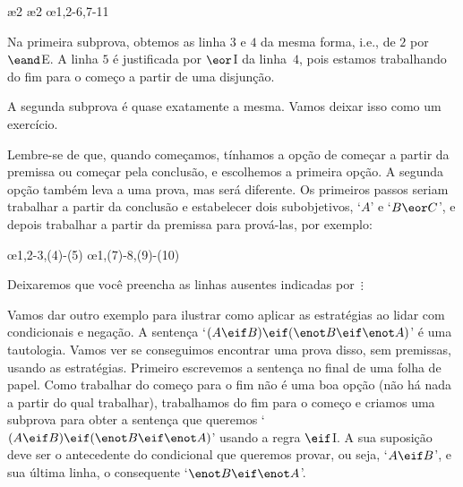 \begin{fitchproof}
	\open
	\ae{2}
	\ae{2}
	\close
	\open
	\ellipsesline
	\close
	\oe{1,2-6,7-11}
\end{fitchproof}
Na primeira subprova, obtemos as linha $3$ e $4$ da mesma forma, i.e.,  de $2$ por  $\eand$E. A linha $5$  é justificada por $\eor$I da linha~$4$, pois estamos trabalhando do fim para o começo a partir de uma disjunção.

A segunda subprova é quase exatamente a mesma. Vamos deixar isso como um exercício.

Lembre-se de que, quando começamos, tínhamos a opção de começar a partir da premissa ou começar pela conclusão, e escolhemos a primeira opção. A segunda opção também leva a uma prova, mas será diferente. Os primeiros passos seriam trabalhar a partir da conclusão e estabelecer dois subobjetivos, `$A$' e `$B \eor C$', e depois trabalhar a partir da premissa para prová-las, por exemplo:
 

\begin{fitchproof}
	\open
	\ellipsesline
	\close
	\open
	\ellipsesline
	\close
	\oe{1,2-3,(4)-(5)}
	\open
	\ellipsesline
	\close
	\open
	\ellipsesline
	\close
	\oe{1,(7)-8,(9)-(10)}	
\end{fitchproof}
Deixaremos que você preencha as linhas ausentes indicadas por~$\vdots$

Vamos dar outro exemplo para ilustrar como aplicar as estratégias ao lidar com condicionais e negação. A sentença `$(A \eif B) \eif (\enot B \eif \enot A)$' é uma tautologia. 
Vamos ver se conseguimos encontrar uma prova disso, sem premissas, usando as estratégias. Primeiro escrevemos a sentença no final de uma folha de papel. Como trabalhar do começo para o fim não é uma boa opção (não há nada a partir do qual trabalhar), trabalhamos do fim para o começo e criamos uma subprova para obter a  sentença que queremos `$(A \eif B) \eif (\enot B \eif \enot A)$' usando a regra  $\eif$I. A sua suposição deve ser o antecedente do condicional que queremos provar, ou seja, `$A \eif B$', e sua última linha, o consequente `$\enot B \eif \enot A$'.
 

